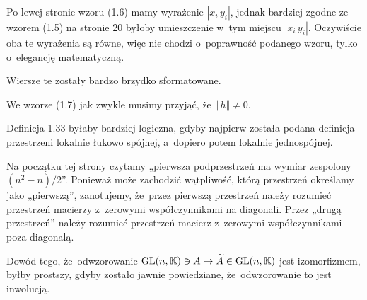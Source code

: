 \documentclass[a4paper,11pt]{article}
\numberwithin{equation}{section}
\begin{document}
\VerSpaceFour





\noindent
{} Po lewej stronie wzoru (1.6) mamy wyrażenie
$| x_{ i } \, y_{ i } |$, jednak bardziej zgodne ze wzorem (1.5) na stronie
20 byłoby umieszczenie w~tym miejscu $| x_{ i } \, \bar{y}_{ i } |$.
Oczywiście oba te wyrażenia są równe, więc nie chodzi o~poprawność
podanego wzoru, tylko o~elegancję matematyczną.

\VerSpaceFour





\noindent
{} Wiersze te zostały bardzo brzydko sformatowane.

\VerSpaceFour





\noindent
{} We wzorze (1.7) jak zwykle musimy przyjąć, że~$\Vert h \Vert \neq 0$.

\VerSpaceFour





\noindent
{} Definicja 1.33 byłaby bardziej logiczna, gdyby najpierw
została podana definicja przestrzeni lokalnie łukowo spójnej, a~dopiero
potem lokalnie jednospójnej.

\VerSpaceFour





\noindent
{} Na początku tej strony czytamy „pierwsza podprzestrzeń ma
wymiar zespolony $( n^{ 2 } - n ) / 2$”. Ponieważ może zachodzić wątpliwość,
którą przestrzeń określamy jako „pierwszą”, zanotujemy, że~przez pierwszą
przestrzeń należy rozumieć przestrzeń macierzy z~zerowymi współczynnikami na
diagonali. Przez „drugą przestrzeń” należy rozumieć przestrzeń macierz
z~zerowymi współczynnikami poza diagonalą.

\VerSpaceFour





\noindent
{} Dowód tego, że~odwzorowanie
$\mathrm{GL}( n, \mathbb{K} ) \ni A \mapsto \widetilde{A} \in \mathrm{GL}( n, \mathbb{K} )$ jest izomorfizmem,
byłby prostszy, gdyby zostało jawnie powiedziane, że~odwzorowanie to jest
inwolucją.

\VerSpaceFour
\end{document}

